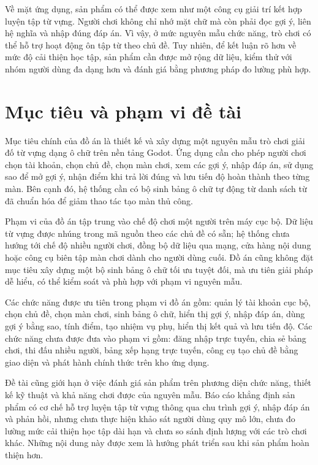 \documentclass[../DoAn.tex]{subfiles}
\begin{document}
Về mặt ứng dụng, sản phẩm có thể được xem như một công cụ giải trí kết hợp luyện tập từ vựng. Người chơi không chỉ nhớ mặt chữ mà còn phải đọc gợi ý, liên hệ nghĩa và nhập đúng đáp án. Vì vậy, ở mức nguyên mẫu chức năng, trò chơi có thể hỗ trợ hoạt động ôn tập từ theo chủ đề. Tuy nhiên, để kết luận rõ hơn về mức độ cải thiện học tập, sản phẩm cần được mở rộng dữ liệu, kiểm thử với nhóm người dùng đa dạng hơn và đánh giá bằng phương pháp đo lường phù hợp.

\section{Mục tiêu và phạm vi đề tài}
\label{section:1.2}
Mục tiêu chính của đồ án là thiết kế và xây dựng một nguyên mẫu trò chơi giải đố từ vựng dạng ô chữ trên nền tảng Godot. Ứng dụng cần cho phép người chơi chọn tài khoản, chọn chủ đề, chọn màn chơi, xem các gợi ý, nhập đáp án, sử dụng sao để mở gợi ý, nhận điểm khi trả lời đúng và lưu tiến độ hoàn thành theo từng màn. Bên cạnh đó, hệ thống cần có bộ sinh bảng ô chữ tự động từ danh sách từ đã chuẩn hóa để giảm thao tác tạo màn thủ công.

Phạm vi của đồ án tập trung vào chế độ chơi một người trên máy cục bộ. Dữ liệu từ vựng được nhúng trong mã nguồn theo các chủ đề có sẵn; hệ thống chưa hướng tới chế độ nhiều người chơi, đồng bộ dữ liệu qua mạng, cửa hàng nội dung hoặc công cụ biên tập màn chơi dành cho người dùng cuối. Đồ án cũng không đặt mục tiêu xây dựng một bộ sinh bảng ô chữ tối ưu tuyệt đối, mà ưu tiên giải pháp dễ hiểu, có thể kiểm soát và phù hợp với phạm vi nguyên mẫu.

Các chức năng được ưu tiên trong phạm vi đồ án gồm: quản lý tài khoản cục bộ, chọn chủ đề, chọn màn chơi, sinh bảng ô chữ, hiển thị gợi ý, nhập đáp án, dùng gợi ý bằng sao, tính điểm, tạo nhiệm vụ phụ, hiển thị kết quả và lưu tiến độ. Các chức năng chưa được đưa vào phạm vi gồm: đăng nhập trực tuyến, chia sẻ bảng chơi, thi đấu nhiều người, bảng xếp hạng trực tuyến, công cụ tạo chủ đề bằng giao diện và phát hành chính thức trên kho ứng dụng.

Đề tài cũng giới hạn ở việc đánh giá sản phẩm trên phương diện chức năng, thiết kế kỹ thuật và khả năng chơi được của nguyên mẫu. Báo cáo khẳng định sản phẩm có cơ chế hỗ trợ luyện tập từ vựng thông qua chu trình gợi ý, nhập đáp án và phản hồi, nhưng chưa thực hiện khảo sát người dùng quy mô lớn, chưa đo lường mức cải thiện học tập dài hạn và chưa so sánh định lượng với các trò chơi khác. Những nội dung này được xem là hướng phát triển sau khi sản phẩm hoàn thiện hơn.
\end{document}
